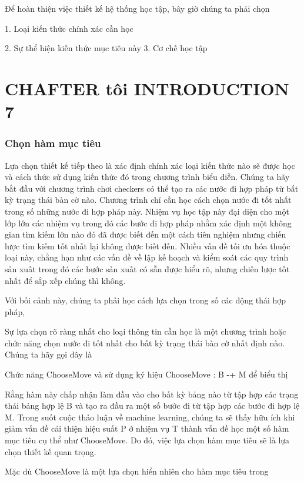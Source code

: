 Để hoàn thiện việc thiết kế hệ thống học tập, bây giờ chúng ta phải chọn

1. Loại kiến ​​thức chính xác cần học

2. Sự thể hiện kiến ​​thức mục tiêu này 3. Cơ chế học tập

\section{CHAFTER tôi INTRODUCTION 7}

\subsubsection{Chọn hàm mục tiêu}

Lựa chọn thiết kế tiếp theo là xác định chính xác loại kiến ​​thức nào sẽ được học và cách thức sử dụng kiến ​​thức đó trong chương trình biểu diễn. Chúng ta hãy bắt đầu với chương trình chơi checkers có thể tạo ra các nước đi hợp pháp từ bất kỳ trạng thái bàn cờ nào. Chương trình chỉ cần học cách chọn nước đi tốt nhất trong số những nước đi hợp pháp này. Nhiệm vụ học tập này đại diện cho một lớp lớn các nhiệm vụ trong đó các bước đi hợp pháp nhằm xác định một không gian tìm kiếm lớn nào đó đã được biết đến một cách tiên nghiệm nhưng chiến lược tìm kiếm tốt nhất lại không được biết đến. Nhiều vấn đề tối ưu hóa thuộc loại này, chẳng hạn như các vấn đề về lập kế hoạch và kiểm soát các quy trình sản xuất trong đó các bước sản xuất có sẵn được hiểu rõ, nhưng chiến lược tốt nhất để sắp xếp chúng thì không.

Với bối cảnh này, chúng ta phải học cách lựa chọn trong số các động thái hợp pháp,

Sự lựa chọn rõ ràng nhất cho loại thông tin cần học là một chương trình hoặc chức năng chọn nước đi tốt nhất cho bất kỳ trạng thái bàn cờ nhất định nào. Chúng ta hãy gọi đây là

Chức năng ChooseMove và sử dụng ký hiệu ChooseMove : B -+ M để biểu thị

Rằng hàm này chấp nhận làm đầu vào cho bất kỳ bảng nào từ tập hợp các trạng thái bảng hợp lệ B và tạo ra đầu ra một số bước đi từ tập hợp các bước đi hợp lệ M. Trong suốt cuộc thảo luận về machine learning, chúng ta sẽ thấy hữu ích khi giảm vấn đề cải thiện hiệu suất P ở nhiệm vụ T thành vấn đề học một số hàm mục tiêu cụ thể như ChooseMove. Do đó, việc lựa chọn hàm mục tiêu sẽ là lựa chọn thiết kế quan trọng.

Mặc dù ChooseMove là một lựa chọn hiển nhiên cho hàm mục tiêu trong

